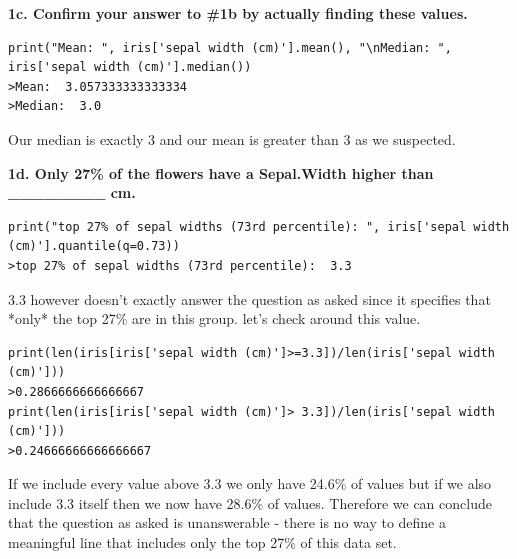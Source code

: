 \documentclass[preview, margin=0.5in]{standalone}
\begin{document}
\textbf{1c. Confirm your answer to \#1b by actually finding these values.}
\begin{verbatim}
print("Mean: ", iris['sepal width (cm)'].mean(), "\nMedian: ", iris['sepal width (cm)'].median())
>Mean:  3.057333333333334 
>Median:  3.0
\end{verbatim}
Our median is exactly 3 and our mean is greater than 3 as we suspected.

\textbf{1d. Only 27\% of the flowers have a Sepal.Width higher than \_\_\_\_\_\_\_\_ cm.}
\begin{verbatim}
print("top 27% of sepal widths (73rd percentile): ", iris['sepal width (cm)'].quantile(q=0.73))
>top 27% of sepal widths (73rd percentile):  3.3
\end{verbatim}
3.3 however doesn't exactly answer the question as asked since it specifies that *only* the top 27\% are in this group.
let's check around this value.
\begin{verbatim}
print(len(iris[iris['sepal width (cm)']>=3.3])/len(iris['sepal width (cm)']))
>0.2866666666666667
print(len(iris[iris['sepal width (cm)']> 3.3])/len(iris['sepal width (cm)']))
>0.24666666666666667
\end{verbatim}
If we include every value above 3.3 we only have 24.6\% of values but if we also include 3.3 itself then we now have 28.6\% of values. Therefore we can conclude that the question as asked is unanswerable - there is no way to define a meaningful line that includes only the top 27\% of this data set.
\end{document}
